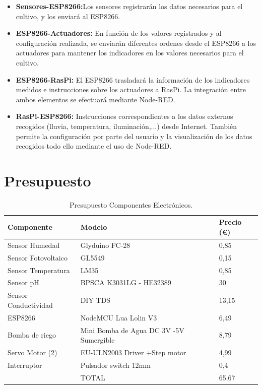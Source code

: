 \documentclass[12pt,a4paper,titlepage,oneside]{report}
\begin{document}
		\begin{itemize}
			\item \textbf{Sensores-ESP8266:}Los sensores registrarán los datos necesarios para el cultivo, y los enviará al ESP8266.
			\item \textbf{ESP8266-Actuadores:} En función de los valores registrados y al configuración realizada, se enviarán diferentes ordenes desde el ESP8266 a los actuadores para mantener los indicadores en los valores necesarios para el cultivo.
			\item \textbf{ESP8266-RasPi:} El ESP8266 trasladará la información de los indicadores medidos e instrucciones sobre los actuadores a RasPi. La integración entre ambos elementos se efectuará mediante Node-RED.
			\item \textbf{RasPi-ESP8266:} Instrucciones correspondientes a los datos externos recogidos (lluvia, temperatura, iluminación,...) desde Internet. También permite la configuración por parte del usuario y la visualización de los datos recogidos todo ello mediante el uso de Node-RED.
			
		\end{itemize}




\newpage
\section{Presupuesto}

\begin{table}[htbp]
\begin{center}
\begin{tabular}{|l||l|l|}
\hline
Componente & Modelo & Precio (€) \\ \hline \hline
Sensor Humedad &	Glyduino FC-28 &	0,85  \\ \hline
Sensor Fotovoltaico &  GL5549 & 0,15 \\ \hline
Sensor Temperatura & LM35 & 0,85 \\ \hline
Sensor pH & BPSCA K3031LG - HE32389 & 30 \\ \hline
Sensor Conductividad & DIY TDS & 13,15 \\ \hline
ESP8266 & NodeMCU Lua Lolin V3 & 6,49 \\ \hline
Bomba de riego & Mini Bomba de Agua DC 3V -5V Sumergible & 8,79 \\ \hline
Servo Motor (2) & EU-ULN2003 Driver +Step motor & 4,99 \\ \hline
Interruptor & Pulsador switch 12mm & 0,4 \\ \hline
  & TOTAL & 65.67 \\ \hline



\end{tabular}
\caption{Presupuesto Componentes Electrónicos.}
\label{tabla:sencilla}
\end{center}
\end{table}
\end{document}
